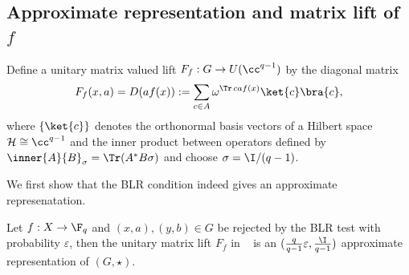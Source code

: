 \subsection{Approximate representation and matrix lift of $f$}\label{sec:rep}

\begin{definition}\label{def:Flift}\leanok
Define a unitary matrix valued lift $F_f : G \to U(\cc^{q-1})$ by the diagonal matrix
\begin{equation}\label{eq:Flift-def}
F_f(x, a) = D(a f(x)) := \sum_{c \in A} \omega^{\Tr\, c a f(x)}\ket{c}\bra{c},
\end{equation}
where $\{\ket{c}\}$ denotes the orthonormal basis vectors of a Hilbert space $\mathcal{H} \cong \cc^{q-1}$ and the inner product between operators defined by $\inner{A}{B}_\sigma=\Tr(A^* B \sigma)$ and choose $\sigma = \I/(q-1)$.
\end{definition}

We first show that the BLR condition indeed gives an approximate represenatation.

\begin{lemma}\label{lem:rep-iff-blr}\leanok
Let $f : X \to \F_q$ and $(x, a), (y, b) \in G$ be rejected by the BLR test with probability $\varepsilon$,
then the unitary matrix lift $F_f$ in ~ is an $(\frac{q}{q-1}\varepsilon, \frac{\I}{q-1})$ approximate representation of $(G, \star)$.
\end{lemma}

